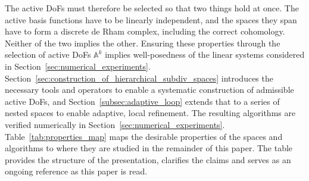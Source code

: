 \documentclass[a4paper, 12pt]{article}
\newcommand{\activeDoFs}{\mathbb{A}}
\newcommand{\activeDoFSet}[2]{\activeDoFs^{#1}_{#2}}
\theoremstyle{definition}
\theoremstyle{plain}
\numberwithin{equation}{section}
\begin{document}
\smallskip

The active DoFs must therefore be selected so that two things hold at once. The active basis functions have to be linearly independent, and the spaces they span have to form a discrete de Rham complex, including the correct cohomology. Neither of the two implies the other. Ensuring these properties through the selection of active DoFs $\activeDoFSet{k}{}$ implies well-posedness of the linear systems considered in Section~\ref{sec:numerical_experiments}. Section~\ref{sec:construction_of_hierarchical_subdiv_spaces} introduces the necessary tools and operators to enable a systematic construction of admissible active DoFs, and Section~\ref{subsec:adaptive_loop} extends that to a series of nested spaces to enable adaptive, local refinement. The resulting algorithms are verified numerically in Section~\ref{sec:numerical_experiments}. Table~\ref{tab:properties_map} maps the desirable properties of the spaces and algorithms to where they are studied in the remainder of this paper. The table provides the structure of the presentation, clarifies the claims and serves as an ongoing reference as this paper is read.
\end{document}
